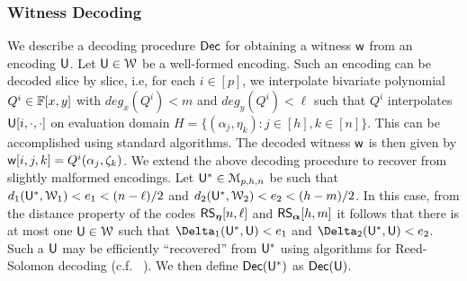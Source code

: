 \subsubsection{Witness Decoding}\label{sec:witdecoding}
We describe a decoding procedure $\mathsf{Dec}$ for obtaining a witness $\mathsf{w}$ from an encoding $\mathsf{U}$. Let $\mathsf{U}\in \mathcal{W}$ be a well-formed encoding. Such an encoding can be decoded slice by slice, i.e, for each $i\in [p]$, we interpolate bivariate polynomial $Q^i\in \mathbb{F}[x,y]$ with $deg_x(Q^i)<m$ and $deg_y(Q^i)<\ell$ such that $Q^i$ interpolates $\mathsf{U}[i,\cdot,\cdot]$ on evaluation domain $H=\{(\alpha_j,\eta_k): j\in [h], k\in [n]\}$. This can be accomplished using standard algorithms. The decoded witness $\mathsf{w}$ is then given by $\mathsf{w}[i,j,k]=Q^i(\alpha_j,\zeta_k)$. We extend the above decoding procedure to recover from slightly malformed encodings. Let $\mathsf{U}^*\in \mathcal{M}_{p,h,n}$ be such that $d_1(\mathsf{U}^*,\mathcal{W}_1)<e_1 <(n-\ell)/2 $ and $d_2(\mathsf{U}^*,\mathcal{W}_2)<e_2 <(h-m)/2$. In this case, from the distance property of the codes $\mathsf{RS}_{\bm{\eta}}[n,\ell]$ and $\mathsf{RS}_{\bm{\alpha}}[h,m]$ it follows that there is at most one $\mathsf{U}\in \mathcal{W}$ such that $\Delta_1(\ewit^*,\ewit)<e_1$ and $\Delta_2(\ewit^*,\ewit)<e_2$. Such a $\mathsf{U}$ may be efficiently ``recovered'' from $\mathsf{U}^*$ using algorithms for Reed-Solomon decoding (c.f. ~\cite{CodingTheory}). We then define $\mathsf{Dec}(\mathsf{U}^*)$ as $\mathsf{Dec}(\mathsf{U})$. 
